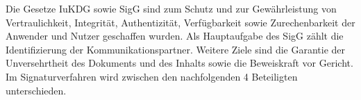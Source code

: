 Die Gesetze IuKDG sowie SigG sind zum Schutz und zur Gewährleistung von Vertraulichkeit, Integrität, Authentizität, Verfügbarkeit sowie Zurechenbarkeit der Anwender und Nutzer geschaffen wurden. \cite{standdeswissens1} Als Hauptaufgabe des SigG zählt die Identifizierung der Kommunikationspartner. Weitere Ziele sind die Garantie der Unversehrtheit des Dokuments und des Inhalts sowie die Beweiskraft vor Gericht. Im Signaturverfahren wird zwischen den nachfolgenden 4 Beteiligten unterschieden. \cite{standdeswissens2}
